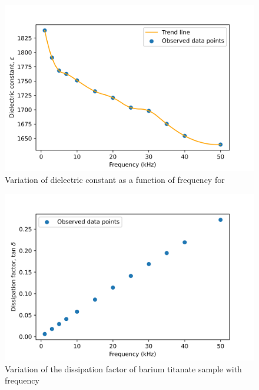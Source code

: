 \documentclass[%
 aip,
 amsmath,amssymb,
 reprint, floatfix%
]{revtex4-1}
\begin{document}
    \begin{figure}
        \centering
        \includegraphics[scale = 0.56]{Figures/plot-batio3.png}
        \caption{Variation of dielectric constant as a function of frequency for }
        \label{fig:batio3}
    \end{figure}
    \begin{figure}
        \centering
        \includegraphics[scale = 0.56]{Figures/plot-dissfac.png}
        \caption{Variation of the dissipation factor of barium titanate sample with frequency}
        \label{fig:diss}
    \end{figure}
    
\end{document}
